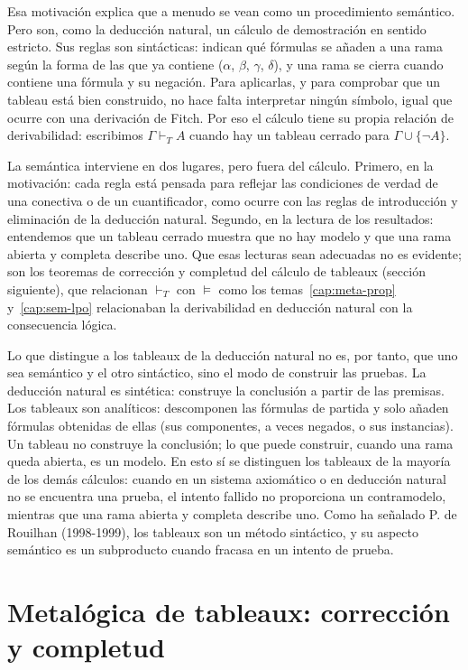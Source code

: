 Esa motivación explica que a menudo se vean como un procedimiento semántico. Pero son, como la deducción natural, un cálculo de demostración en sentido estricto. Sus reglas son sintácticas: indican qué fórmulas se añaden a una rama según la forma de las que ya contiene ($\alpha$, $\beta$, $\gamma$, $\delta$), y una rama se cierra cuando contiene una fórmula y su negación. Para aplicarlas, y para comprobar que un tableau está bien construido, no hace falta interpretar ningún símbolo, igual que ocurre con una derivación de Fitch. Por eso el cálculo tiene su propia relación de derivabilidad: escribimos $\Gamma \vdash_T A$ cuando hay un tableau cerrado para $\Gamma \cup \{\neg A\}$.

La semántica interviene en dos lugares, pero fuera del cálculo. Primero, en la motivación: cada regla está pensada para reflejar las condiciones de verdad de una conectiva o de un cuantificador, como ocurre con las reglas de introducción y eliminación de la deducción natural. Segundo, en la lectura de los resultados: entendemos que un tableau cerrado muestra que no hay modelo y que una rama abierta y completa describe uno. Que esas lecturas sean adecuadas no es evidente; son los teoremas de corrección y completud del cálculo de tableaux (sección siguiente), que relacionan $\vdash_T$ con $\models$ como los temas~\ref{cap:meta-prop} y~\ref{cap:sem-lpo} relacionaban la derivabilidad en deducción natural con la consecuencia lógica. 

Lo que distingue a los tableaux de la deducción natural no es, por
tanto, que uno sea semántico y el otro sintáctico, sino el modo de
construir las pruebas. La deducción natural es sintética: construye la
conclusión a partir de las premisas. Los tableaux son analíticos:
descomponen las fórmulas de partida y solo añaden fórmulas obtenidas
de ellas (sus componentes, a veces negados, o sus instancias). Un
tableau no construye la conclusión; lo que puede construir, cuando una
rama queda abierta, es un modelo. En esto sí se distinguen los
tableaux de la mayoría de los demás cálculos: cuando en un sistema
axiomático o en deducción natural no se encuentra una prueba, el
intento fallido no proporciona un contramodelo, mientras que una rama
abierta y completa describe uno. Como ha señalado P. de Rouilhan
(1998-1999), los tableaux son un método sintáctico, y su aspecto
semántico es un subproducto cuando fracasa en un intento de prueba. 

\section{Metalógica de tableaux: corrección y completud\ampliacion}

